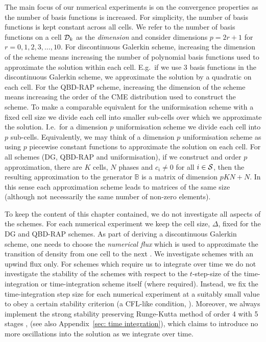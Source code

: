 The main focus of our numerical experiments is on the convergence properties as the number of basis functions is increased. For simplicity, the number of basis functions is kept constant across all cells. We refer to the number of basis functions on a cell \(\mathcal{D}_k\) as the \emph{dimension} and consider dimensions \(p=2r+1\) for \(r=0,1,2,3,...,10\). For discontinuous Galerkin scheme, increasing the dimension of the scheme means increasing the number of polynomial basis functions used to approximate the solution within each cell. E.g.~if we use 3 basis functions in the discontinuous Galerkin scheme, we approximate the solution by a quadratic on each cell. For the QBD-RAP scheme, increasing the dimension of the scheme means increasing the order of the CME distribution used to construct the scheme. To make a comparable equivalent for the uniformisation scheme with a fixed cell size we divide each cell into smaller sub-cells over which we approximate the solution. I.e.~for a dimension \(p\) uniformisation scheme we divide each cell into \(p\) sub-cells. Equivalently, we may think of a dimension \(p\) uniformisation scheme as using \(p\) piecewise constant functions to approximate the solution on each cell. For all schemes (DG, QBD-RAP and uniformisation), if we construct and order \(p\) approximation, there are \(K\) cells, \(N\) phases and \(c_i\neq 0\) for all \(i\in\mathcal{S}\), then the resulting approximation to the generator \(\mathbb B\) is a matrix of dimension \(pKN + N\). In this sense each approximation scheme leads to matrices of the same size (although not necessarily the same number of non-zero elements). 

To keep the content of this chapter contained, we do not investigate all aspects of the schemes. For each numerical experiment we keep the cell size, \(\Delta\), fixed for the DG and QBD-RAP schemes. As part of deriving a discontinuous Galerkin scheme, one needs to choose the \emph{numerical flux} which is used to approximate the transition of density from one cell to the next \citep{nodalDGBook}. We investigate schemes with an upwind flux only. For schemes which require us to integrate over time we do not investigate the stability of the schemes with respect to the \(t\)-step-size of the time-integration or time-integration scheme itself (where required). Instead, we fix the time-integration step size for each numerical experiment at a suitably small value to obey a certain stability criterion (a CFL-like condition, \citep[Section~4.8]{nodalDGBook}). Moreover, we always implement the strong stability preserving Runge-Kutta method of order 4 with 5 stages \citep{sr2002}, \citep[Section~5.7]{nodalDGBook} (see also Appendix~\ref{sec: time integration}), which claims to introduce no more oscillations into the solution as we integrate over time. 

